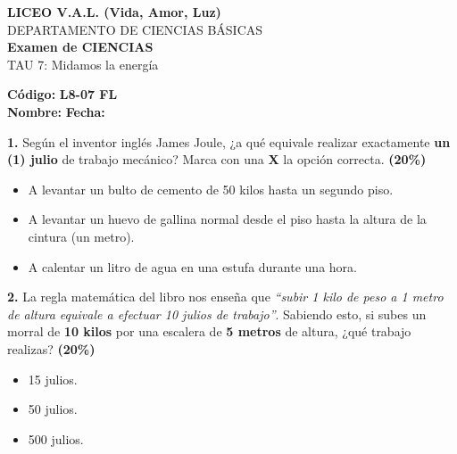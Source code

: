 \documentclass[12pt, letterpaper]{article}
\newif\ifshowanswers
\newcommand{\choice}[1]{%
	\ifshowanswers
	\if#1V \textcolor{blue}{$\boxtimes$}\else $\square$\fi
	\else
	$\square$
	\fi
}
\begin{document}
	
	\begin{center} 
		{\Large \textbf{LICEO V.A.L. (Vida, Amor, Luz)}}\\[0.1cm] 
		{\large DEPARTAMENTO DE CIENCIAS BÁSICAS}\\[0.1cm] 
		\textbf{Examen de CIENCIAS }\\[0.1cm] 
		TAU 7: Midamos la energía 
	\end{center}
	
	\vspace{0.3cm}
	\hfill \textbf{Código:} \textbf{L8-07 FL}\\
	\noindent \textbf{Nombre:} \underline{\hspace{8cm}} \hspace{1cm}\textbf{Fecha:} \underline{\hspace{3cm}}
	
	\vspace{0.8cm}
	
	\noindent \textbf{1.} Según el inventor inglés James Joule, ¿a qué equivale realizar exactamente \textbf{un (1) julio} de trabajo mecánico? Marca con una \textbf{X} la opción correcta. \hfill\textbf{(20\%)}
	
	\vspace{0.3cm} 
	\begin{itemize}[itemsep=0.4cm, label={}] 
		\item[ \choice{F} ] A levantar un bulto de cemento de 50 kilos hasta un segundo piso. 
		\item[ \choice{V} ] A levantar un huevo de gallina normal desde el piso hasta la altura de la cintura (un metro). 
		\item[ \choice{F} ] A calentar un litro de agua en una estufa durante una hora. 
	\end{itemize}
	
	\vspace{0.5cm}
	\noindent \textbf{2.} La regla matemática del libro nos enseña que \textit{``subir 1 kilo de peso a 1 metro de altura equivale a efectuar 10 julios de trabajo''}. Sabiendo esto, si subes un morral de \textbf{10 kilos} por una escalera de \textbf{5 metros} de altura, ¿qué trabajo realizas? \hfill\textbf{(20\%)}
	
	\vspace{0.3cm} 
	\begin{itemize}[itemsep=0.4cm, label={}] 
		\item[ \choice{F} ] 15 julios. 
		\item[ \choice{F} ] 50 julios. 
		\item[ \choice{V} ] 500 julios. 
	\end{itemize}
	
\end{document}
